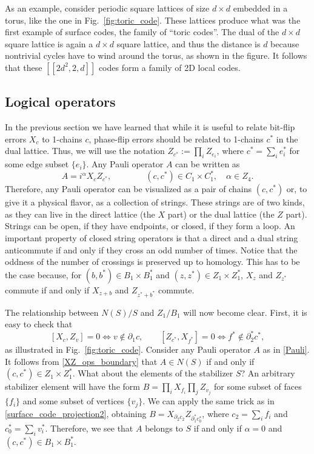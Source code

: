 \documentclass{article}
\newcommand{\sset}[1]{ \{#1\} }
\newcommand{\nin}{ \not\in}
\newcommand{\dual}[1]{{#1}^{\ast}}
\begin{document}
As an example, consider periodic square lattices of size $d\times d$ embedded in a torus, like the one in Fig.~\ref{fig:toric_code}. These lattices produce what was the first example of surface codes, the family of ``toric codes''. The dual of the $d\times d$ square lattice is again a $d\times d$ square lattice, and thus the distance is $d$ because nontrivial cycles have to wind around the torus, as shown in the figure. It follows that these $[[2d^2,2,d]]$ codes form a family of 2D local codes.


\subsection{Logical operators}

In the previous section we have learned that while it is useful to relate bit-flip errors $X_c$ to 1-chains $c$, phase-flip errors should be related to 1-chains $\dual c$ in the dual lattice. Thus, we will use the notation $Z_{\dual c}:=\prod_{i} Z_{e_i}$, where $\dual c=\sum_i {\dual e_i}$ for some edge subset $\sset{e_i}$. Any Pauli operator $A$ can be written as
\begin{equation}\label{Pauli}
A=i^{\alpha} X_{c} Z_{\dual c},\qquad\qquad (c,\dual c) \in C_1\times\dual C_1,\quad\alpha\in Z_4.
\end{equation}
Therefore, any Pauli operator can be visualized as a pair of chains $(c,\dual c)$ or, to give it a physical flavor, as a collection of strings. These strings are of two kinds, as they can live in the direct lattice (the $X$ part) or the dual lattice (the $Z$ part). Strings can be open, if they have endpoints, or closed, if they form a loop. An important property of closed string operators is that a direct and a dual string anticommute if and only if they cross an odd number of times. Notice that the oddness of the number of crossings is preserved up to homology. This has to be the case because, for $(b,\dual b) \in B_1\times\dual B_1$ and $(z,\dual z) \in Z_1\times\dual Z_1$, $X_z$ and $Z_{\dual z}$ commute if and only if $X_{z+b}$ and $Z_{\dual z+\dual b}$ commute.

The relationship between $N(S)/S$ and $Z_1/B_1$ will now become clear. First, it is easy to check that
\begin{equation}\label{XZ_ops_boundary}
[X_c,Z_v]=0\iff v\nin \partial_1 c,\qquad [Z_{\dual c},X_{\dual f}]=0\iff \dual f\nin \dual \partial_2 \dual c,
\end{equation}
as illustrated in Fig.~\ref{fig:toric_code}. Consider any Pauli operator $A$ as in \eqref{Pauli}. It follows from \eqref{XZ_ops_boundary} that $A\in N(S)$ if and only if $(c,\dual c) \in Z_1\times \dual Z_1$. What about the elements of the stabilizer $S$? An arbitrary stabilizer element will have the form $B=\prod_{i} X_{f_i}\prod_{j} Z_{v_j}$ for some subset of faces $\sset{f_i}$ and some subset of vertices $\sset{v_j}$. We can apply the same trick as in \eqref{surface_code_projection2}, obtaining $B=X_{\partial_2 c_2}Z_{\dual \partial_1 \dual c_0}$, where $c_2=\sum_i f_i$ and $\dual c_0=\sum_i \dual v_i$. Therefore, we see that $A$ belongs to $S$ if and only if $\alpha=0$ and $(c,\dual c)\in B_1\times \dual B_1$.
\end{document}

